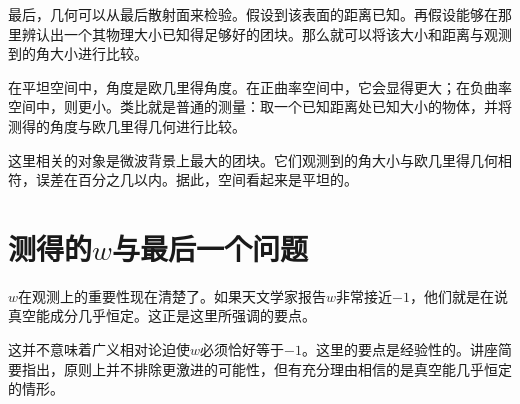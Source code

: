 最后，几何可以从最后散射面来检验。假设到该表面的距离已知。再假设能够在那里辨认出一个其物理大小已知得足够好的团块。那么就可以将该大小和距离与观测到的角大小进行比较。

在平坦空间中，角度是欧几里得角度。在正曲率空间中，它会显得更大；在负曲率空间中，则更小。类比就是普通的测量：取一个已知距离处已知大小的物体，并将测得的角度与欧几里得几何进行比较。

\begin{classroomqa}
\end{classroomqa}

这里相关的对象是微波背景上最大的团块。它们观测到的角大小与欧几里得几何相符，误差在百分之几以内。据此，空间看起来是平坦的。

\section{测得的\(w\)与最后一个问题}

\(w\)在观测上的重要性现在清楚了。如果天文学家报告\(w\)非常接近\(-1\)，他们就是在说真空能成分几乎恒定。这正是这里所强调的要点。

这并不意味着广义相对论迫使\(w\)必须恰好等于\(-1\)。这里的要点是经验性的。讲座简要指出，原则上并不排除更激进的可能性，但有充分理由相信的是真空能几乎恒定的情形。

\begin{classroomqa}
\end{classroomqa}